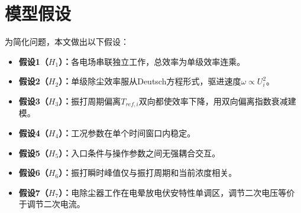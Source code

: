
\section{模型假设}

为简化问题，本文做出以下假设：

\begin{itemize}[itemindent=2em]
\item \textbf{假设1（$H_1$）：}各电场串联独立工作，总效率为单级效率连乘。
\item \textbf{假设2（$H_2$）：}单级除尘效率服从Deutsch方程形式，驱进速度$\omega\propto U_i^2$。
\item \textbf{假设3（$H_3$）：}振打周期偏离$T_{ref,i}$双向都使效率下降，用双向偏离指数衰减建模。
\item \textbf{假设4（$H_4$）：}工况参数在单个时间窗口内稳定。
\item \textbf{假设5（$H_5$）：}入口条件与操作参数之间无强耦合交互。
\item \textbf{假设6（$H_6$）：}振打瞬时峰值仅与振打周期和当前浓度相关。
\item \textbf{假设7（$H_7$）：}电除尘器工作在电晕放电伏安特性单调区，调节二次电压等价于调节二次电流。
\end{itemize}
